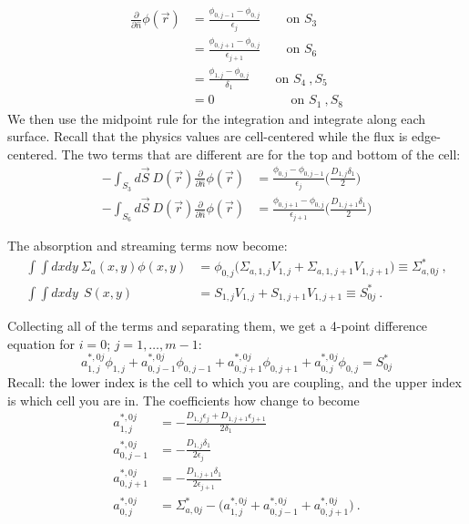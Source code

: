 \documentclass[12pt]{article}
\begin{document}
\begin{align}
\frac{\partial}{\partial \hat{n}}\phi(\vec{r}) &= \frac{\phi_{0,j-1} - \phi_{0,j}}{\epsilon_j} \qquad \text{on } S_3 \nonumber \\
%
&= \frac{\phi_{0,j+1} - \phi_{0,j}}{\epsilon_{j+1}} \qquad \text{on } S_6 \nonumber \\
%
&= \frac{\phi_{1,j} - \phi_{0,j}}{\delta_{1}} \qquad \text{on } S_4 \:, S_5 \nonumber \\
%
&= 0 \qquad \qquad \qquad \text{on } S_1 \:, S_8 \nonumber 
\end{align}
%
We then use the midpoint rule for the integration and integrate along each surface. Recall that the physics values are cell-centered while the flux is edge-centered. The two terms that are different are for the top and bottom of the cell:
%
\begin{align}
- \int_{S_3} d\vec{S} \:D(\vec{r})\frac{\partial}{\partial \hat{n}}\phi(\vec{r}) &= \frac{\phi_{0,j} - \phi_{0,j-1}}{\epsilon_{j}} \biggl(\frac{D_{1,j} \delta_{1}}{2}\biggr) \nonumber \\ 
%
- \int_{S_6} d\vec{S} \:D(\vec{r})\frac{\partial}{\partial \hat{n}}\phi(\vec{r}) &= \frac{\phi_{0,j+1} - \phi_{0,j}}{\epsilon_{j+1}} \biggl(\frac{D_{1,j+1} \delta_{1}}{2}\biggr) \nonumber
\end{align}

The absorption and streaming terms now become:
\begin{align}
\int \int dx dy\:\Sigma_a(x,y) \phi(x,y) &= \boxed{\phi_{0,j}\bigl(\Sigma_{a,1,j} V_{1,j} + \Sigma_{a,1,j+1} V_{1,j+1} \bigr) \equiv \Sigma^*_{a,0j}}\:, \nonumber \\
%
\int \int dx dy \: \:S(x,y) &= \boxed{S_{1,j} V_{1,j} + S_{1,j+1} V_{1,j+1} \equiv S^*_{0j}}\:. \nonumber
\end{align}

\vspace*{2em}
Collecting all of the terms and separating them, we get a 4-point difference equation for $i=0$; $j=1,\dots,m-1$:
%
\[\boxed{a_{1,j}^{*,0j}\phi_{1,j} + a_{0,j-1}^{*,0j}\phi_{0,j-1} + a_{0,j+1}^{*,0j}\phi_{0,j+1} +  a_{0,j}^{*,0j}\phi_{0,j} = S^*_{0j}} \]
%
Recall: the lower index is the cell to which you are coupling, and the upper index is which cell you are in. The coefficients how change to become
\begin{align}
a_{1,j}^{*,0j} &= -\frac{D_{1,j} \epsilon_{j} + D_{1,j+1} \epsilon_{j+1}}{2 \delta_{1}}  \nonumber \\
%
a_{0,j-1}^{*,0j} &= -\frac{D_{1,j} \delta_{1}}{2 \epsilon_{j}}  \nonumber \\
%
a_{0,j+1}^{*,0j} &= -\frac{D_{1,j+1} \delta_{1}}{2 \epsilon_{j+1}}  \nonumber \\
%
a_{0,j}^{*,0j} &= \Sigma^*_{a,0j} - \bigl(a_{1,j}^{*,0j} + a_{0,j-1}^{*,0j} + a_{0,j+1}^{*,0j} \bigr)
 \:.\nonumber 
\end{align}
\end{document}
